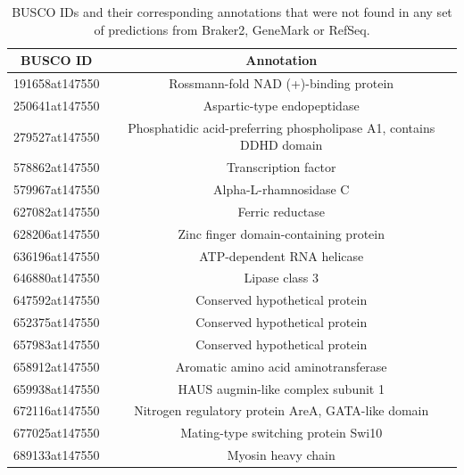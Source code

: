 \begin{table}[h]
  \centering
  \begin{tabular}{|c|c|}
    \hline
    BUSCO ID & Annotation \\ \hline
    191658at147550 & Rossmann-fold NAD (+)-binding protein \\ \hline
    250641at147550 & Aspartic-type endopeptidase \\ \hline
    279527at147550 & Phosphatidic acid-preferring phospholipase A1, contains DDHD domain \\ \hline
    578862at147550 & Transcription factor \\ \hline
    579967at147550 & Alpha-L-rhamnosidase C \\ \hline
    627082at147550 & Ferric reductase \\ \hline
    628206at147550 & Zinc finger domain-containing protein \\ \hline
    636196at147550 & ATP-dependent RNA helicase \\ \hline
    646880at147550 & Lipase class 3 \\ \hline
    647592at147550 & Conserved hypothetical protein \\ \hline
    652375at147550 & Conserved hypothetical protein \\ \hline
    657983at147550 & Conserved hypothetical protein \\ \hline
    658912at147550 & Aromatic amino acid aminotransferase \\ \hline
    659938at147550 & HAUS augmin-like complex subunit 1 \\ \hline
    672116at147550 & Nitrogen regulatory protein AreA, GATA-like domain \\ \hline
    677025at147550 & Mating-type switching protein Swi10 \\ \hline
    689133at147550 & Myosin heavy chain \\ \hline
  \end{tabular}
  \caption[Missing BUSCO IDs]{BUSCO IDs and their corresponding annotations that were not found in any set of predictions from Braker2, GeneMark or RefSeq.}\label{table:missed-busco-all}
\end{table}

